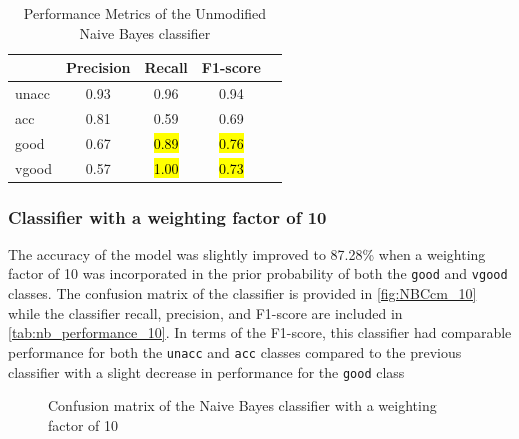 \documentclass[a4paper]{article}
\begin{document}
\begin{table}[ht]
  \centering
  \caption{Performance Metrics of the Unmodified Naive Bayes classifier}
  \label{tab:nb_performance_5}
  \begin{tabular}{lcccc}
  \toprule
  \textbf{ } & \textbf{Precision} & \textbf{Recall} & \textbf{F1-score} \\
  \midrule
  unacc & 0.93 & 0.96 & 0.94\\
  acc  & 0.81 & 0.59 & 0.69\\
  good & 0.67 & \hl{0.89} & \hl{0.76}\\
  vgood & 0.57 & \hl{1.00} & \hl{0.73}\\
  \bottomrule
  \end{tabular}
\end{table}


\subsubsection{Classifier with a weighting factor of 10}
The accuracy of the model was slightly improved to 87.28\% when a weighting factor of 10 was incorporated in the prior probability of both the \lstinline{good} and \lstinline{vgood} classes. The confusion matrix of the classifier is provided in \autoref{fig:NBCcm_10} while the classifier recall, precision, and F1-score are included in \autoref{tab:nb_performance_10}. In terms of the F1-score, this classifier had comparable performance for both the \lstinline{unacc} and \lstinline{acc} classes compared to the previous classifier with a slight decrease in performance for the \lstinline{good} class

\begin{figure} [h]
  \caption{Confusion matrix of the Naive Bayes classifier with a weighting factor of 10} 
  \label{fig:NBCcm_10}
\end{figure}
\end{document}
